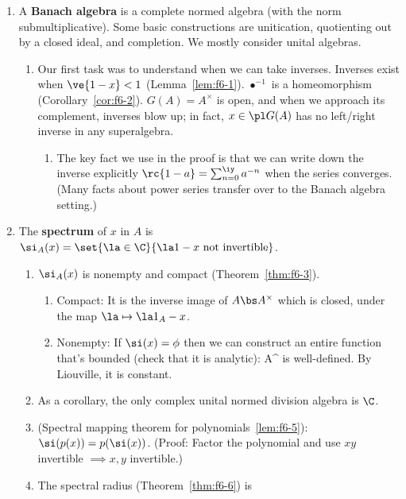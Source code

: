 \begin{enumerate}
\item
A \textbf{Banach algebra} is a complete normed algebra (with the norm submultiplicative). Some basic constructions are unitication, quotienting out by a closed ideal, and completion. We mostly consider unital algebras. 
\begin{enumerate}
\item
Our first task was to understand when we can take inverses. Inverses exist when $\ve{1-x}<1$ (Lemma~\ref{lem:f6-1}). $\bullet^{-1}$ is a homeomorphism (Corollary~\ref{cor:f6-2}). $G(A)=A^{\times}$ is open, and when we approach its complement, inverses blow up; in fact, $x\in \pl G(A)$ has no left/right inverse in any superalgebra.
\begin{enumerate}
\item
The key fact we use in the proof is that we can write down the inverse explicitly $\rc{1-a}=\sum_{n=0}^{\iy} a^{-n}$ when the series converges. (Many facts about power series transfer over to the Banach algebra setting.)
\end{enumerate}
\end{enumerate}
\item The \textbf{spectrum} of $x$ in $A$ is $\si_A(x)=\set{\la\in \C}{\la 1-x\text{ not invertible}}$. 
\begin{enumerate}
\item
$\si_A(x)$ is nonempty and compact (Theorem~\ref{thm:f6-3}). 
\begin{enumerate}
\item Compact: %
It is the inverse image of $A\bs A^{\times}$ which is closed, under the map $\la\mapsto \la 1_A-x$.
\item Nonempty: If $\si(x)=\phi$ then we can construct an entire function that's bounded (check that it is analytic): 
\la\mapsto {}\in A^{\times}
\eeq
is well-defined. By Liouville, it is constant.
\end{enumerate}
\item As a corollary, the only complex unital normed division algebra is $\C$.
\item (Spectral mapping theorem for polynomials~\ref{lem:f6-5}): $\si(p(x))=p(\si(x))$. (Proof: Factor the polynomial and use $xy$ invertible $\implies x,y$ invertible.)
\item The spectral radius (Theorem~\ref{thm:f6-6}) is

\end{enumerate}
\end{enumerate}
